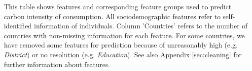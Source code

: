 \begin{table}[ht!]
\begin{subcaption2}
This table shows features and corresponding feature groups used to predict carbon intensity of consumption. All sociodemographic features refer to self-identified information of individuals. Column 'Countries' refers to the number of countries with non-missing information for each feature. For some countries, we have removed some features for prediction because of unreasonably high (e.g. \textit{District}) or no resolution (e.g. \textit{Education}). See also Appendix \ref{sec:cleaning} for further information about features.
\end{subcaption2}

\end{table}